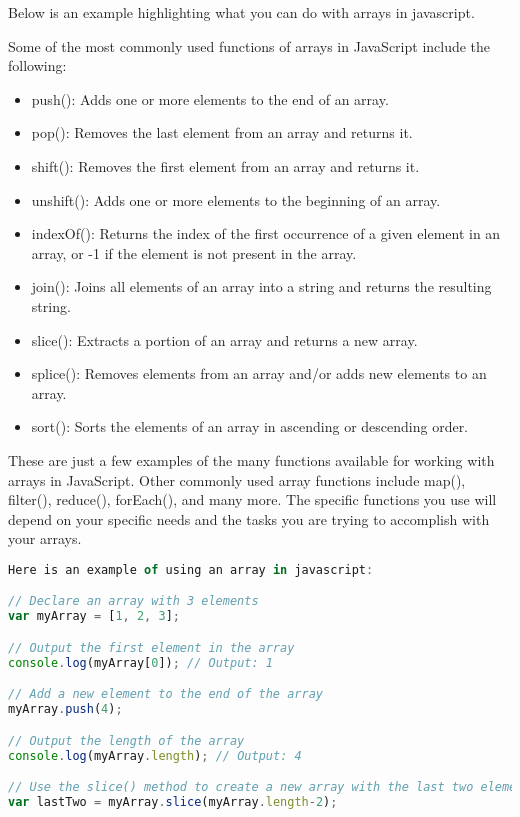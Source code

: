 {Below is an example highlighting what you can do with arrays in javascript.

Some of the most commonly used functions of arrays in JavaScript include the following:
\begin{itemize}
\item push(): Adds one or more elements to the end of an array.
\item  pop(): Removes the last element from an array and returns it.
\item  shift(): Removes the first element from an array and returns it.
\item  unshift(): Adds one or more elements to the beginning of an array.
\item  indexOf(): Returns the index of the first occurrence of a given element in an array, or -1 if the element is not present in the array.
\item join(): Joins all elements of an array into a string and returns the resulting string.
\item slice(): Extracts a portion of an array and returns a new array.
\item splice(): Removes elements from an array and/or adds new elements to an array.
\item  sort(): Sorts the elements of an array in ascending or descending order.
\end{itemize}
These are just a few examples of the many functions available for working with arrays in JavaScript. Other commonly used array functions include map(), filter(), reduce(), forEach(), and many more. The specific functions you use will depend on your specific needs and the tasks you are trying to accomplish with your arrays.

\begin{lstlisting}[language=Javascript, caption=Javascript array example]
Here is an example of using an array in javascript:

// Declare an array with 3 elements
var myArray = [1, 2, 3];

// Output the first element in the array
console.log(myArray[0]); // Output: 1

// Add a new element to the end of the array
myArray.push(4);

// Output the length of the array
console.log(myArray.length); // Output: 4

// Use the slice() method to create a new array with the last two elements of the original array
var lastTwo = myArray.slice(myArray.length-2);


\end{lstlisting}}
